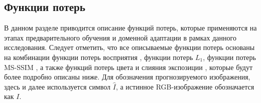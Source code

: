 \subsection{Функции потерь}\label{sect-4-4}

В данном разделе приводится описание функций потерь, которые применяются на этапах предварительного обучения и доменной адаптации в рамках данного исследования. Следует отметить, что все описываемые функции потерь основаны на комбинации функции потерь восприятия \cite{lib-vgg-loss}, функции потерь $L_1$, функции потерь MS-SSIM \cite{lib-msssim}, а также функций потерь цвета и слияния экспозиции \cite{lib-exp-fusion}, которые будут более подробно описаны ниже. Для обозначения прогнозируемого изображения, здесь и далее используется символ $\hat{I}$, а истинное RGB-изображение обозначается как $I$.








